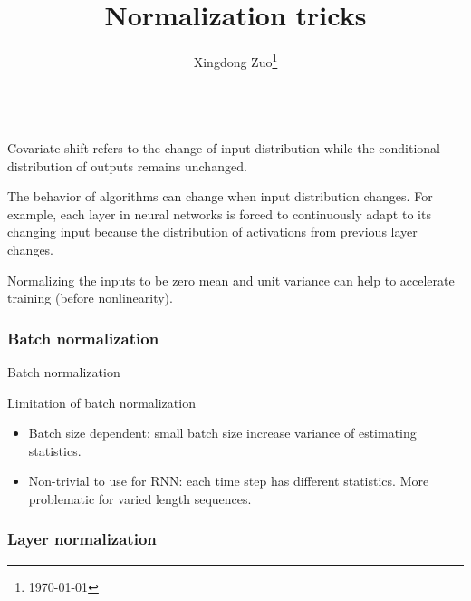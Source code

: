 \documentclass{article}
\title{Normalization tricks}
\author{
    Xingdong Zuo\thanks{\today} \\
     \\
}
\begin{document}
\maketitle

\begin{definition}
Covariate shift refers to the change of input distribution while the conditional distribution of outputs remains unchanged.
\end{definition}
The behavior of algorithms can change when input distribution changes. For example, each layer in neural networks is forced to continuously adapt to its changing input because the distribution of activations from previous layer changes. 

Normalizing the inputs to be zero mean and unit variance can help to accelerate training (before nonlinearity).

\subsubsection*{Batch normalization}

\begin{algorithm}[H]
\SetAlgoNoLine
{}

    \caption{Batch normalization}
    \label{algo:batchnorm}
\end{algorithm}

Limitation of batch normalization
\begin{itemize}
    \item Batch size dependent: small batch size increase variance of estimating statistics. 
    \item Non-trivial to use for RNN: each time step has different statistics. More problematic for varied length sequences. 
\end{itemize}

\subsubsection*{Layer normalization}
\end{document}
